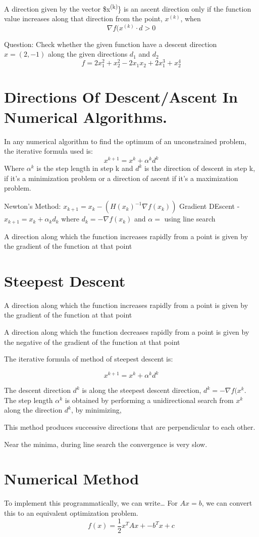 \documentclass[11pt]{report}
\begin{document}
A direction given by the vector \$x\textsuperscript{(k)}\} is an ascent direction only if the function value increases along that direction from the point, \(x^{(k)}\), when
$$\nabla f(x^{(k)}\cdot d > 0$$

Question: Check whether the given function have a descent direction \(x = (2,-1)\) along the given directions \(d_1\) and \(d_2\)
$$f = 2x_1^{2} + x_2^2-2x_1x_2 + 2x_1^3 + x_2^4$$
\section{Directions Of Descent/Ascent In Numerical Algorithms.}
\label{sec:org9d327bb}
In any numerical algorithm to find the optimum of an unconstrained problem, the iterative formula used is:
$$x^{k+1} = x^k + \alpha^kd^k$$
Where \(\alpha^k\) is the step length in step k and \(d^k\) is the direction of descent in step k, if it's a minimization problem or a direction of ascent if it's a maximization problem.

Newton's Method: \(x_{k+1} = x_k -(H(x_k)^{-1}\nabla f(x_k))\)
Gradient DEscent - \(x_{k+1} = x_k + \alpha_kd_k\) where \(d_k = - \nabla f(x_k)\) and \(\alpha =\) using line search

A direction along which the function increases rapidly from a point is given by the gradient of the function at that point
\section{Steepest Descent}
\label{sec:org9b1255f}
A direction along which the function increases rapidly from a point is given by the gradient of the function at that point

A direction along which the function decreases rapidly from a point is given by the negative of the gradient of the function at that point

The iterative formula of method of steepest descent is:

$$x^{k+1} = x^k + \alpha^k d^k$$

The descent direction \(d^k\) is along the steepest descent direction, \(d^k = - \nabla f(x^k\). The step length \(\alpha^k\) is obtained by performing a unidirectional search from \(x^k\) along the direction \(d^k\), by minimizing,

This method produces successive directions that are perpendicular to each other.

Near the minima, during line search the convergence is very slow.
\section{Numerical Method}
\label{sec:org0a9b5d6}
To implement this programmatically, we can write\ldots{}
For \(Ax=b\), we can convert this to an equivalent optimization problem.
$$f(x) = \frac{1}{2}x^TAx + - b^Tx + c$$
\end{document}
